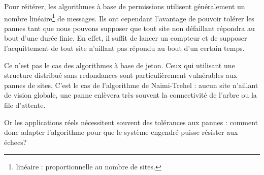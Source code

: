Pour réitérer, les algorithmes à base de permissions utilisent généralement un nombre linéaire\footnote{ linéaire : proportionnelle au nombre de sites. } de messages. Ils ont cependant l'avantage de pouvoir tolérer les pannes tant que nous pouvons supposer que tout site non défaillant répondra au bout d'une durée finie. En effet, il suffit de lancer un compteur et de supposer l'acquittement de tout site n'aillant pas répondu au bout d'un certain temps.

Ce n'est pas le cas des algorithmes à base de jeton. Ceux qui utilisant une structure distribué sans redondances sont particulièrement vulnérables aux pannes de sites. C'est le cas de l'algorithme de Naimi-Trehel : aucun site n'aillant de vision globale, une panne enlèvera très souvent la connectivité de l'arbre ou la file d'attente.

Or les applications réels nécessitent souvent des tolérances aux pannes : comment donc adapter l'algorithme pour que le système engendré puisse résister aux échecs?